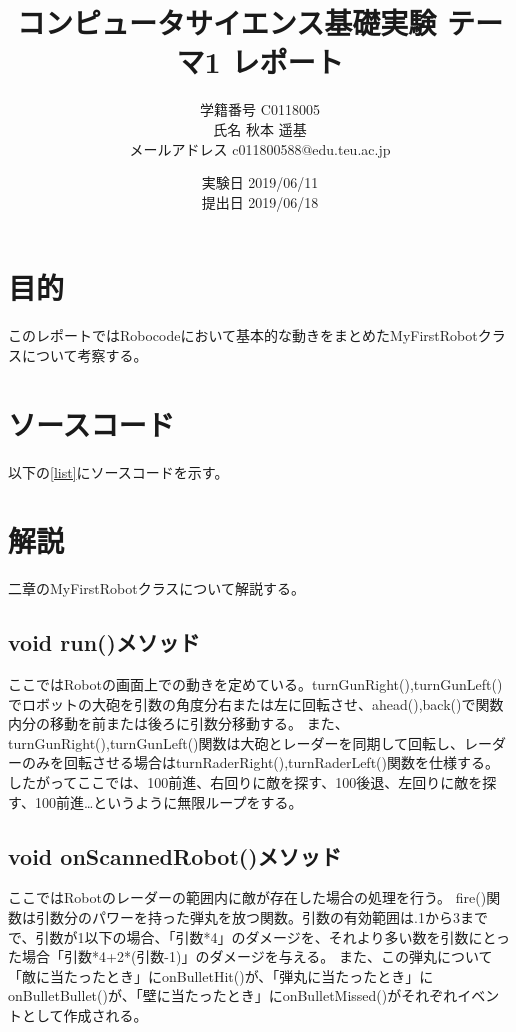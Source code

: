 \documentclass[a4j, titlepage]{jsarticle}
\title{コンピュータサイエンス基礎実験 テーマ1 レポート}
\author{学籍番号 C0118005\\氏名 秋本 遥基\\メールアドレス c011800588@edu.teu.ac.jp}
\date{実験日 2019/06/11\\提出日 2019/06/18}
\begin{document}
\begin{titlepage}
\maketitle
\end{titlepage}


\section{目的}

このレポートではRobocodeにおいて基本的な動きをまとめたMyFirstRobotクラスについて考察する。

\section{ソースコード}
以下の\ref{list}にソースコードを示す。



\section{解説}

二章のMyFirstRobotクラスについて解説する。

\subsection{void run()メソッド}
ここではRobotの画面上での動きを定めている。turnGunRight(),turnGunLeft()でロボットの大砲を引数の角度分右または左に回転させ、ahead(),back()で関数内分の移動を前または後ろに引数分移動する。
また、turnGunRight(),turnGunLeft()関数は大砲とレーダーを同期して回転し、レーダーのみを回転させる場合はturnRaderRight(),turnRaderLeft()関数を仕様する。
したがってここでは、100前進、右回りに敵を探す、100後退、左回りに敵を探す、100前進…というように無限ループをする。

\subsection{void onScannedRobot()メソッド}
ここではRobotのレーダーの範囲内に敵が存在した場合の処理を行う。
fire()関数は引数分のパワーを持った弾丸を放つ関数。引数の有効範囲は.1から3までで、引数が1以下の場合、「引数*4」のダメージを、それより多い数を引数にとった場合「引数*4+2*(引数-1)」のダメージを与える。
また、この弾丸について「敵に当たったとき」にonBulletHit()が、「弾丸に当たったとき」にonBulletBullet()が、「壁に当たったとき」にonBulletMissed()がそれぞれイベントとして作成される。
\end{document}
